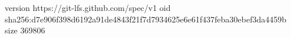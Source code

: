 version https://git-lfs.github.com/spec/v1
oid sha256:d7e906f398d6192a91de4843f21f7d7934625e6e61f437feba30ebef3da4459b
size 369806
